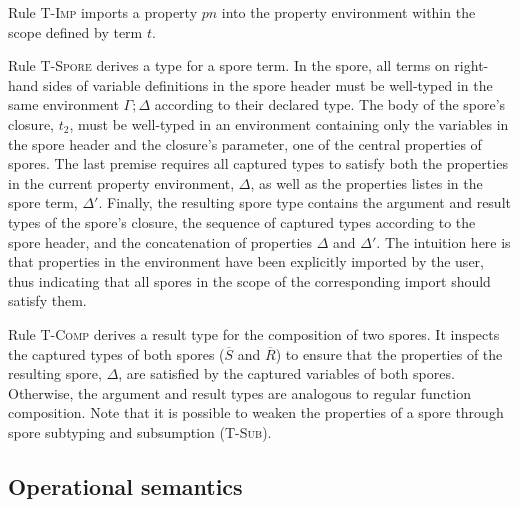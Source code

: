 \documentclass[runningheads]{llncs}
\newcommand{\seq}[1]{\overline{#1}}
\begin{document}
\begin{sloppypar}
Rule \textsc{T-Imp} imports a property $pn$ into the property environment within the scope defined by term $t$.

Rule \textsc{T-Spore} derives a type for a spore term. In the spore, all terms on right-hand sides of variable definitions in the spore header must be well-typed in the same environment $\Gamma ; \Delta$ according to their declared type. The body of the spore's closure, $t_2$, must be well-typed in an environment containing only the variables in the spore header and the closure's parameter, one of the central properties of spores. The last premise requires all captured types to satisfy both the properties in the current property environment, $\Delta$, as well as the properties listes in the spore term, $\Delta'$. Finally, the resulting spore type contains the argument and result types of the spore's closure, the sequence of captured types according to the spore header, and the concatenation of properties $\Delta$ and $\Delta'$. The intuition here is that properties in the environment have been explicitly imported by the user, thus indicating that all spores in the scope of the corresponding import should satisfy them.

Rule \textsc{T-Comp} derives a result type for the composition of two spores. It inspects the captured types of both spores ($\seq{S}$ and $\seq{R}$) to ensure that the properties of the resulting spore, $\Delta$, are satisfied by the captured variables of both spores. Otherwise, the argument and result types are analogous to regular function composition. Note that it is possible to weaken the properties of a spore through spore subtyping and subsumption (\textsc{T-Sub}).

\subsection{Operational semantics}\label{sec:opsem}

\begin{figure}[t!]
  \centering
\vspace{-7mm}
\begin{mathpar}





\end{mathpar}
\end{figure}
\end{sloppypar}
\end{document}

